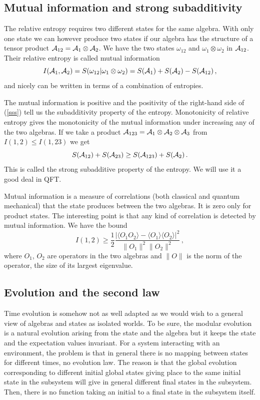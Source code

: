 \documentclass[12pt]{article}
\numberwithin{equation}{section}
\newcommand{\be}{\begin{equation}}
\newcommand{\ee}{\end{equation}}
\begin{document}
\subsection{Mutual information and strong subadditivity}
\label{mumu}


The relative entropy requires two different states for the same algebra. With only one state we can however produce two states if our algebra has the structure of a tensor product ${\cal A}_{12}={\cal A}_1\otimes {\cal A}_2$. We have the two states $\omega_{12}$ and $\omega_1\otimes \omega_2$ in   ${\cal A}_{12}$. Their relative entropy is called mutual information 
\be
I({\cal A}_1, {\cal A}_2)= S(\omega_{12}|\omega_1\otimes \omega_2)=S({\cal A}_1)+S({\cal A}_2)-S({\cal A}_{12})\,,
\label{sss} \ee
and nicely can be written in terms of a combination of entropies. 

The mutual information is positive and the positivity of the right-hand side of (\ref{sss}) tell us the subadditivity property of the entropy. Monotonicity of relative entropy gives the monotonicity of the mutual information under increasing any of the two algebras. If we take a product  ${\cal A}_{123}={\cal A}_1\otimes {\cal A}_2\otimes {\cal A}_3$ from $I(1,2)\le I(1,23)$ we get 
\be
S({\cal A}_{12})+S({\cal A}_{23})\ge S({\cal A}_{123})+S({\cal A}_{2})\,.
\ee
This is called the strong subadditive property of the entropy. We will use it a good deal in QFT. 

Mutual information is a measure of correlations (both classical and quantum mechanical) that the state produces between the two algebras. It is zero only for product states. The interesting point is that any kind of correlation is detected by mutual information. We have the bound
\be  
I(1,2)\ge \frac{1}{2}\frac{|\langle O_1 O_2\rangle -\langle O_1 \rangle \langle O_2 \rangle|^2}{\|O_1\|^2 \|O_2\|^2 }\,,
\ee
where $O_1$, $O_2$ are operators in the two algebras and $\|O\|$ is the norm of the operator, the size of its largest eigenvalue. 

\subsection{Evolution and the second law}

Time evolution is somehow not as well adapted as we would wish to a general view of algebras and states as isolated worlds. 
To be sure, the modular evolution is a natural evolution arising from the state and the algebra but it keeps the state and the expectation values invariant. For a system interacting with an environment, the problem is that in general there is no mapping between states for different times, no evolution law. The reason is that the global evolution corresponding to different initial global states giving place to the same initial state in the subsystem will give in general different final states in the subsystem. Then, there is no function taking an initial to a final state in the subsystem itself.   
\end{document}
